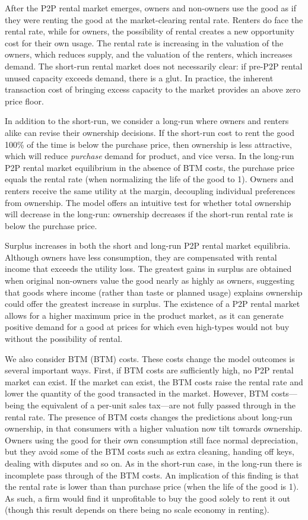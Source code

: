 \documentclass[11pt]{article}
\begin{document}
After the P2P rental market emerges, owners and non-owners use the good as if they were renting the good at the market-clearing rental rate. 
Renters do face the rental rate, while for owners, the possibility of rental creates a new opportunity cost for their own usage. 
The rental rate is increasing in the valuation of the owners, which reduces supply, and the valuation of the renters, which increases demand. 
The short-run rental market does not necessarily clear: if pre-P2P rental unused capacity exceeds demand, there is a glut. 
In practice, the inherent transaction cost of bringing excess capacity to the market provides an above zero price floor.

In addition to the short-run, we consider a long-run where owners and renters alike can revise their ownership decisions. 
If the short-run cost to rent the good 100\% of the time is below the purchase price, then ownership is less attractive, which will reduce \emph{purchase} demand for product, and vice versa. 
In the long-run P2P rental market equilibrium in the absence of BTM costs, the purchase price equals the rental rate (when normalizing the life of the good to 1).
Owners and renters receive the same utility at the margin, decoupling individual preferences from ownership. 
The model offers an intuitive test for whether total ownership will decrease in the long-run:
ownership decreases if the short-run rental rate is below the purchase price. 

Surplus increases in both the short and long-run P2P rental market equilibria.
Although owners have less consumption, they are compensated with rental income that exceeds the utility loss. 
The greatest gains in surplus are obtained when original non-owners value the good nearly as highly as owners, suggesting that goods where income (rather than taste or planned usage) explains ownership could offer the greatest increase in surplus. 
The existence of a P2P rental market allows for a higher maximum price in the product market, as it can generate positive demand for a good at prices for which even high-types would not buy without the possibility of rental. 

We also consider BTM (BTM) costs.
These costs change the model outcomes is several important ways.
First, if BTM costs are sufficiently high, no P2P rental market can exist.
If the market can exist, the BTM costs raise the rental rate and lower the quantity of the good transacted in the market.
However, BTM costs---being the equivalent of a per-unit sales tax---are not fully passed through in the rental rate.
The presence of BTM costs changes the predictions about long-run ownership, in that consumers with a higher valuation now tilt towards ownership.
Owners using the good for their own consumption still face normal depreciation, but they avoid some of the BTM costs such as extra cleaning, handing off keys, dealing with disputes and so on. 
As in the short-run case, in the long-run there is incomplete pass through of the BTM costs.
An implication of this finding is that the rental rate is lower than than purchase price (when the life of the good is 1).
As such, a firm would find it unprofitable to buy the good solely to rent it out (though this result depends on there being no scale economy in renting). 
\end{document}
